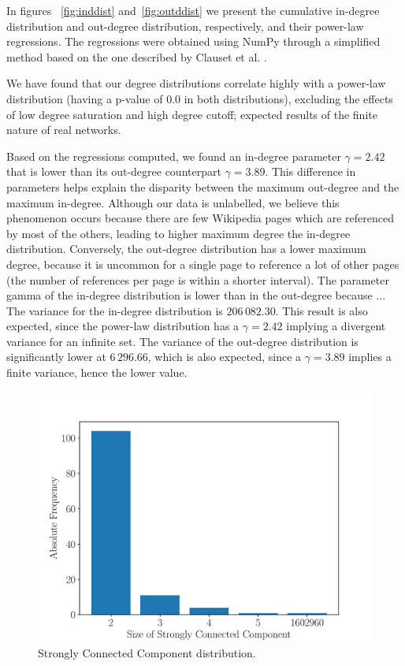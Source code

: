 \documentclass[9pt,a4paper,twocolumn]{article}
\begin{document}
In figures ~\ref{fig:inddist} and~\ref{fig:outddist} we present the cumulative in-degree distribution and out-degree distribution, respectively, and their power-law regressions. The regressions were obtained using NumPy through a simplified method based on the one described by Clauset et al. \cite{Clauset2009}.

We have found that our degree distributions correlate highly with a power-law distribution (having a p-value of $0.0$ in both distributions), excluding the effects of low degree saturation and high degree cutoff; expected results of the finite nature of real networks.

Based on the regressions computed, we found an in-degree parameter $\gamma = 2.42$ that is lower than its out-degree counterpart $\gamma = 3.89$. This difference in parameters helps explain the disparity between the maximum out-degree and the maximum in-degree. Although our data is unlabelled, we believe this phenomenon occurs because there are few Wikipedia pages which are referenced by most of the others, leading to higher maximum degree the in-degree distribution. Conversely, the out-degree distribution has a lower maximum degree, because it is uncommon for a single page to reference a lot of other pages (the number of references per page is within a shorter interval). The parameter gamma of the in-degree distribution is lower than in the out-degree because ... %
The variance for the in-degree distribution is $206\,082.30$. This result is also expected, since the power-law distribution has a $\gamma = 2.42$ implying a divergent variance for an infinite set. The variance of the out-degree distribution is significantly lower at $6\,296.66$, which is also expected, since a $ \gamma = 3.89 $ implies a finite variance, hence the lower value.

\begin{figure}[h]
	\centering
	\includegraphics[width=\linewidth]{wikipedia_pt_sccdistr.pdf}
	\caption{Strongly Connected Component distribution.}
	\label{fig:sccdist}
\end{figure}
\end{document}
